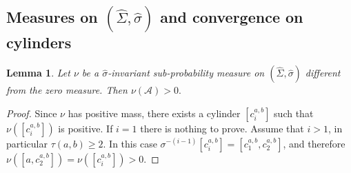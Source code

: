 \documentclass[letterpaper,11pt]{amsart}
\theoremstyle{plain}
\theoremstyle{plain}
\newtheorem{lemma}[proposition]{Lemma}
\theoremstyle{definition}
\theoremstyle{remark}
\def\A{{\mathcal A}}
\begin{document}
\subsection{Measures on $(\widehat{\Sigma},\widehat{\sigma})$ and convergence on cylinders}

\begin{lemma}\label{lem:p} Let $\nu$ be a $\widehat{\sigma}$-invariant sub-probability measure on $(\widehat{\Sigma},\widehat{\sigma})$ different from the zero measure. Then $\nu(\A)>0.$
\end{lemma}
\begin{proof} Since $\nu$ has positive mass, there exists a cylinder $[c_i^{a,b}]$ such that $\nu([c_i^{a,b}])$ is positive. If $i=1$ there is nothing to prove. Assume that $i>1$, in particular $\tau(a,b)\ge 2$. In this case $\sigma^{-(i-1)}[c_i^{a,b}]=[c_1^{a,b}, c_2^{a,b}]$, and therefore $\nu([a,c_2^{a,b}])=\nu([c_i^{a,b}])>0.$
\end{proof}
\end{document}
